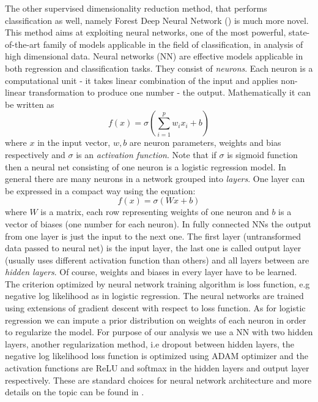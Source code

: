 \documentclass[shortabstract, english, mgr]{iithesis}
\begin{document}
The other supervised dimensionality reduction method, that performs classification as well, namely Forest Deep Neural Network (\cite{fDNN}) is much more novel. This method aims at exploiting neural networks, one of the most powerful, state-of-the-art family of models applicable in the field of classification, in analysis of high dimensional data. Neural networks (NN) are effective models applicable in both regression and classification tasks. They consist of \textit{neurons}. Each neuron is a computational unit -  it takes linear combination of the input and applies non-linear transformation to produce one number - the output. Mathematically it can be written as $$f(x) = \sigma \left(\sum_{i=1}^p w_ix_i + b\right)$$where $x$ in the input vector, $w,b$ are neuron parameters, weights and bias respectively and $\sigma$ is an \textit{activation function}. Note that if $\sigma$ is sigmoid function then a neural net consisting of one neuron is a logistic regression model. In general there are many neurons in a network grouped into \textit{layers}. One layer can be expressed in a compact way using the equation: $$ f(x) = \sigma \left(Wx + b\right)$$where $W$ is a matrix, each row representing weights of one neuron and $b$ is a vector of biases (one number for each neuron). In fully connected NNs the output from one layer is just the input to the next one. The first layer (untransformed data passed to neural net) is the input layer, the last one is called output layer (usually uses different activation function than others) and all layers between are \textit{hidden layers}. Of course, weights and biases in every layer have to be learned. The criterion optimized by neural network training algorithm is loss function, e.g negative log likelihood as in logistic regression. The neural networks are trained using extensions of gradient descent with respect to loss function. As for logistic regression we can impute a prior distribution on weights of each neuron in order to regularize the model. For purpose of our analysis we use a NN with two hidden layers, another regularization method, i.e dropout between hidden layers, the negative log likelihood loss function is optimized using ADAM optimizer and the activation functions are ReLU and softmax in the hidden layers and output layer respectively. These are standard choices for neural network architecture and more details on the topic can be found in \cite{deeplearning}.
\end{document}
